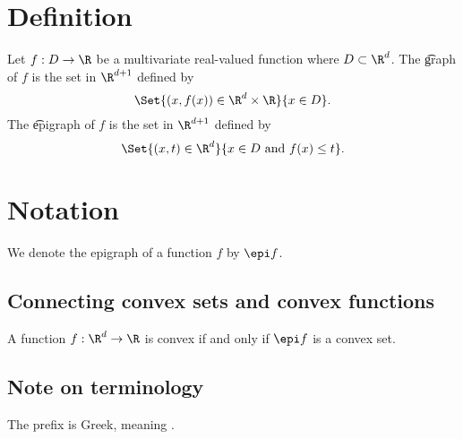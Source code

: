 
\section*{Definition}

Let $f: D \to \R $ be a multivariate real-valued function where $D \subset \R ^d$.
The \t{graph} of $f$ is the set in $\R ^{d + 1}$ defined by
  \[
\Set{(x, f(x)) \in \R ^d \times \R }{x \in D}.
  \]
The \t{epigraph} of $f$ is the set in $\R ^{d + 1}$ defined by
  \[
\Set{(x, t) \in \R ^{d}}{x \in D \text{ and } f(x) \leq t}.
  \]

\section*{Notation}

We denote the epigraph of a function $f$ by $\epi f$.




\subsection*{Connecting convex sets and convex functions}

A function $f: \R ^d \to \R $ is convex if and only if $\epi f$ is a convex set.
\subsection*{Note on terminology}

The prefix  is Greek, meaning .

\blankpage
